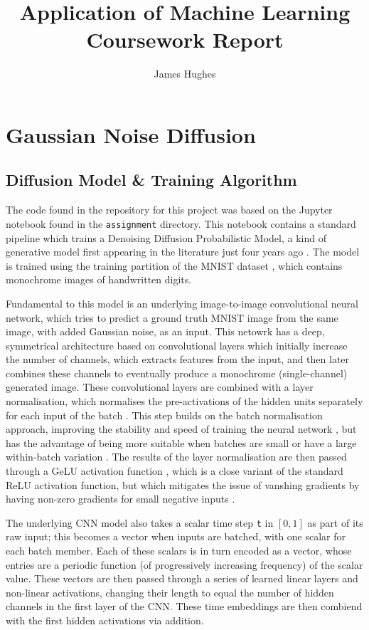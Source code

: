 \documentclass[12pt]{article}
\title{Application of Machine Learning Coursework Report}
\author{James Hughes}
\begin{document}
\maketitle

\newpage

\tableofcontents

\newpage

\section{Gaussian Noise Diffusion}
\subsection{Diffusion Model \& Training Algorithm}
The code found in the repository for this project was based on the Jupyter notebook found in the \texttt{assignment} directory.
This notebook contains a standard pipeline which trains a Denoising Diffusion Probabilistic Model,
a kind of generative model first appearing in the literature just four years ago \cite{ho2020denoising}.
The model is trained using the training partition of the MNIST dataset \cite{mnist}, which contains monochrome images of handwritten digits.

Fundamental to this model is an underlying image-to-image convolutional neural network,
which tries to predict a ground truth MNIST image from the same image, with added Gaussian noise, as an input.
This netowrk has a deep, symmetrical architecture based on convolutional layers which initially increase the number of channels,
which extracts features from the input, and then later combines these channels to eventually produce a monochrome (single-channel) generated image.
These convolutional layers are combined with a layer normalisation,
which normalises the pre-activations of the hidden units separately for each input of the batch \cite{ba2016layer}.
This step builds on the batch normalisation approach, improving the stability and speed of training the neural network \cite{ba2016layer},
but has the advantage of being more suitable when batches are small or have a large within-batch variation \cite{prince2023understanding}.
The results of the layer normalisation are then passed through a GeLU activation function \cite{hendrycks2023gaussian},
which is a close variant of the standard ReLU activation function,
but which mitigates the issue of vanshing gradients by having non-zero gradients for small negative inputs \cite{nguyen2021analysis}.

The underlying CNN model also takes a scalar time step \texttt{t} in $[0,1]$ as part of its raw input; this becomes a vector when inputs are batched,
with one scalar for each batch member.
Each of these scalars is in turn encoded as a vector, whose entries are a periodic function (of progressively increasing frequency)
of the scalar value.
These vectors are then passed through a series of learned linear layers and non-linear activations,
changing their length to equal the number of hidden channels in the first layer of the CNN.
These time embeddings are then combiend with the first hidden activations via addition.
\end{document}
